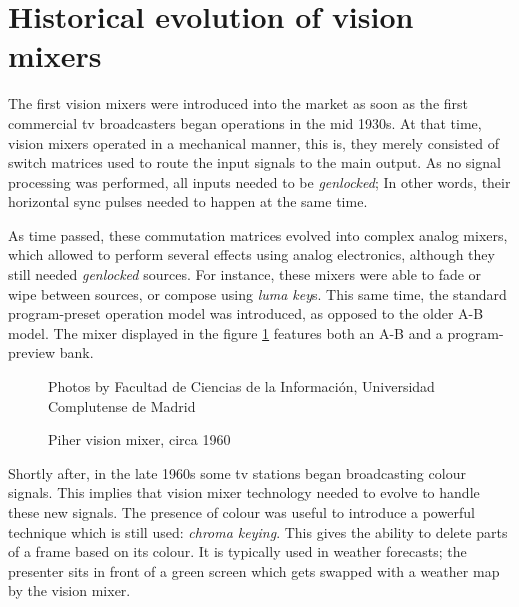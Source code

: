 \documentclass[../main.tex]{subfiles}
\begin{document}
\label{chap:soa}

\section{Historical evolution of vision mixers}
The first vision mixers were introduced into the market as soon as the first commercial \gls{tv} broadcasters began operations in the mid 1930s. At that time, vision mixers operated in a mechanical manner, this is, they merely consisted of switch matrices used to route the input signals to the main output. As no signal processing was performed, all inputs needed to be \textit{genlocked}; In other words, their horizontal sync pulses needed to happen at the same time\cite{becg2020}.\newline

As time passed, these commutation matrices evolved into complex analog mixers, which allowed to perform several effects using analog electronics, although they still needed \textit{genlocked} sources. For instance, these mixers were able to fade or wipe between sources, or compose using \textit{luma key}s\cite{WardPeter2001Saob}. This same time, the standard program-preset operation model was introduced, as opposed to the older A-B model. The mixer displayed in the figure \ref{fig:02:piher} features both an A-B and a program-preview bank.\newline

\begin{figure}[htbp]
    \centering
    
    \footnotesize{Photos by Facultad de Ciencias de la Información, Universidad Complutense de Madrid}
    \caption{Piher vision mixer, circa 1960}
    \label{fig:02:piher}
\end{figure}

Shortly after, in the late 1960s some \gls{tv} stations began broadcasting colour signals. This implies that vision mixer technology needed to evolve to handle these new signals. The presence of colour was useful to introduce a powerful technique which is still used: \textit{chroma keying}\cite{jpeters}\cite{tmMixerHistory}. This gives the ability to delete parts of a frame based on its colour. It is typically used in weather forecasts; the presenter sits in front of a green screen which gets swapped with a weather map by the vision mixer.\newline
\end{document}
